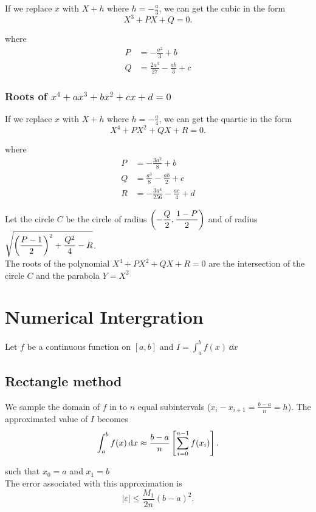 \documentclass{report}
\begin{document}
If we replace $x$ with $X+h$ where $h = -\frac{a}{3}$, we can get the cubic in the form
\[
	X^3 + PX + Q = 0
	.\]

where
\begin{align*}
	P & = -\frac{a^2}{3}+b                 \\
	Q & = \frac{2a^3}{27} - \frac{ab}{3}+c
\end{align*}

\subsection{Roots of $x^4+ax^3+bx^2+cx+d=0$}

If we replace $x$ with $X+h$ where $h = -\frac{a}{4}$, we can get the quartic in the form
\[
	X^4 + PX^2 + QX + R = 0
	.\]

where
\begin{align*}
	P & = -\frac{3a^2}{8}+b                   \\
	Q & = \frac{a^3}{8} -\frac{ab}{2} + c     \\
	R & = -\frac{3a^4}{256} -\frac{ac}{4} + d
\end{align*}

Let the circle $C$ be the circle of radius $\displaystyle\left(-\frac{Q}{2},\frac{1-P}{2}\right)$ and of radius $\displaystyle\sqrt{\left(\frac{P-1}{2}\right)^2 + \frac{Q^2}{4} - R}$.\\

The roots of the polynomial $X^4 + PX^2 + QX + R = 0$ are the intersection of the circle $C$ and the parabola $Y=X^2$


\chapter{Numerical Intergration}


Let $f$ be a continuous function on $[a,b]$ and $I=\int_a^b f(x)\,\dd{x}$

\section{Rectangle method}

We sample the domain of $f$ in to $n$ equal subintervals ($x_i - x_{i+1}=\frac{b-a}{n}=h$). The approximated value of $I$ becomes
\[
	\int_a^b f(x)\,\mathrm{d}x \approx \frac{b-a}{n}\left[ \sum_{i=0}^{n-1} f(x_i) \right]
	.\]

such that $x_0=a$ and $x_1=b$\\

The error associated with this approximation is
\[
	|\varepsilon|\leq \frac{M_1}{2n}(b-a)^2
	.\]
\end{document}
